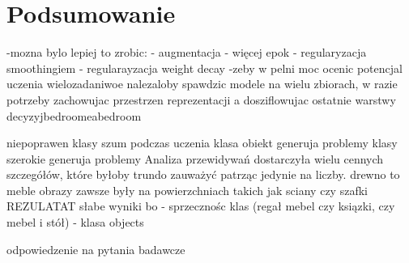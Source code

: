 \newpage %
\section{Podsumowanie}

-mozna bylo lepiej to zrobic:
    - augmentacja
    - więcej epok
    - regularyzacja smoothingiem
    - regularayzacja weight decay
-zeby w pelni moc ocenic potencjal uczenia wielozadaniwoe nalezaloby spawdzic modele na wielu zbiorach, w razie potrzeby zachowujac przestrzen reprezentacji a dosziflowujac ostatnie warstwy decyzyjbedroomeabedroom



niepoprawen klasy szum podczas uczenia
klasa obiekt generuja problemy klasy szerokie generuja problemy
Analiza przewidywań dostarczyła wielu cennych szczegółów, które byłoby trundo zauważyć patrząc jedynie na liczby.
drewno to meble
obrazy zawsze były na powierzchniach takich jak sciany czy szafki
REZULATAT
słabe wyniki bo
- sprzecznośc klas (regał mebel czy ksiązki, czy mebel i stół)
- klasa objects


odpowiedzenie na pytania badawcze